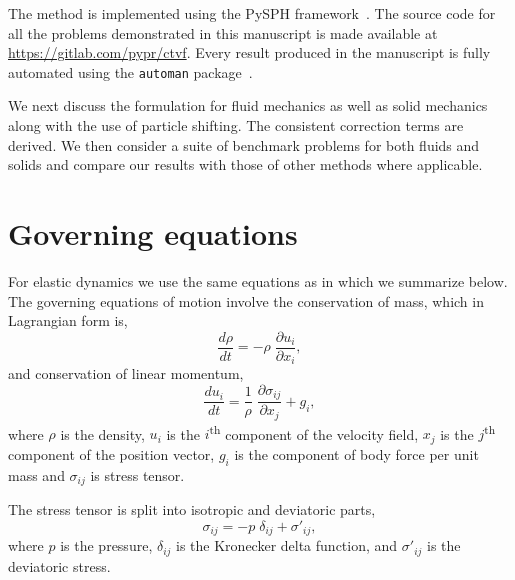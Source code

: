 The method is implemented using the PySPH
framework~\citep{PR:pysph:scipy16,pysph2020}. The source code for all the
problems demonstrated in this manuscript is made available at
\url{https://gitlab.com/pypr/ctvf}. Every result produced in the manuscript is
fully automated using the \texttt{automan} package~\citep{pr:automan:2018}.

We next discuss the formulation for fluid mechanics as well as solid mechanics
along with the use of particle shifting. The consistent correction terms are
derived. We then consider a suite of benchmark problems for both fluids and
solids and compare our results with those of other methods where applicable.

\section{Governing equations}
For elastic dynamics we use the same equations as in
\citep{gray-ed-2001,zhang_hu_adams17} which we summarize below. The governing
equations of motion involve the conservation of mass, which in Lagrangian
form is,
\begin{equation}
  \label{eq:ce}
  \frac{d \rho}{d t} = - \rho \; \frac{\partial u_i}{\partial x_i},
\end{equation}
and conservation of linear momentum,
\begin{equation}
  \label{eq:me}
  \frac{d u_i}{d t} = \frac{1}{\rho} \; \frac{\partial \sigma_{ij}}{\partial x_j}
  + g_i,
\end{equation}
where $\rho$ is the density, $u_i$ is the $i$\textsuperscript{th} component of
the velocity field, $x_j$ is the $j$\textsuperscript{th} component of the
position vector, $g_i$ is the component of body force per unit mass and
$\sigma_{ij}$ is stress tensor.

The stress tensor is split into isotropic and deviatoric parts,
\begin{equation}
  \label{eq:stress_tensor_decomposition}
  \sigma_{ij} = - p \; \delta_{ij} + \sigma'_{ij},
\end{equation}
%
where $p$ is the pressure, $\delta_{ij}$ is the Kronecker delta function, and
$\sigma'_{ij}$ is the deviatoric stress.

